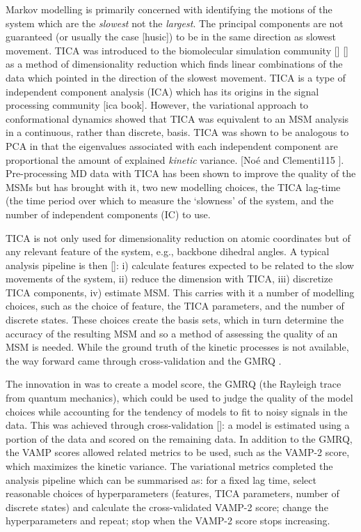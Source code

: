 Markov modelling is primarily concerned with identifying the motions of the system which are the \emph{slowest} not the \emph{largest}. The principal components are not guaranteed (or usually the case [husic]) to be in the same direction as slowest movement. TICA was introduced to the biomolecular simulation community [] [] as a method of dimensionality reduction which finds linear combinations of the data which pointed in the direction of the slowest movement. TICA is a type of independent component analysis (ICA) which has its origins in the signal processing community [ica book]. However, the variational approach to conformational dynamics showed that TICA was equivalent to an MSM analysis in a continuous, rather than discrete, basis. TICA was shown to be analogous to PCA in that the eigenvalues associated with each independent component are proportional the amount of explained \emph{kinetic} variance. [Noé and Clementi115 ]. Pre-processing MD data with TICA has been shown to improve the quality of the MSMs but has brought with it, two new modelling choices, the TICA lag-time (the time period over which to measure the `slowness' of the system, and the number of independent components (IC) to use. 

TICA is not only used for dimensionality reduction on atomic coordinates but of any relevant feature of the system, e.g.,  backbone dihedral angles. A typical analysis pipeline is then []: i) calculate features expected to be related to the slow movements of the system, ii) reduce the dimension with TICA, iii) discretize TICA components, iv) estimate MSM. This carries with it a number of modelling choices, such as the choice of feature, the TICA parameters, and the number of discrete states. These choices create the basis sets, which in turn determine the accuracy of the resulting MSM and so a method of assessing the quality of an MSM is needed. While the ground truth of the kinetic processes is not available, the way forward came through cross-validation and the GMRQ \cite{mcgibbonVariationalCrossvalidationSlow2015}. 

The innovation in \cite{mcgibbonVariationalCrossvalidationSlow2015} was to create a model score, the GMRQ (the Rayleigh trace from quantum mechanics), which could be used to judge the quality of the model choices while accounting for the tendency of models to fit to noisy signals in the data. This was achieved through cross-validation []: a model is estimated using a portion of the data and scored on the remaining data. In addition to the GMRQ, the VAMP scores allowed related metrics to be used, such as the VAMP-2 score, which maximizes the kinetic variance. The variational metrics completed the analysis pipeline \cite{schererVariationalSelectionFeatures2019} which can be summarised as: for a fixed lag time, select reasonable choices of  hyperparameters (features, TICA parameters, number of discrete states) and calculate the cross-validated VAMP-2 score; change the hyperparameters and repeat; stop when the VAMP-2 score stops increasing. 

